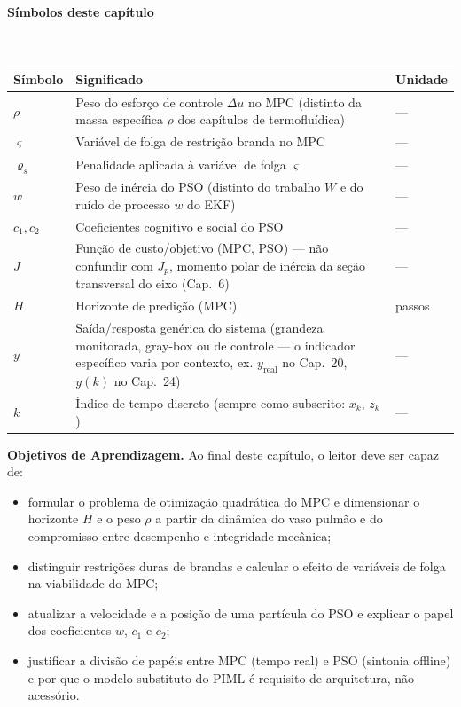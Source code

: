 \documentclass[12pt,a4paper]{article}
\numberwithin{equation}{section}
\numberwithin{table}{section}
\numberwithin{figure}{section}
\begin{document}
{\paragraph{Símbolos deste capítulo}\mbox{}\\[-0.5em]
{\small
\begin{longtable}{>{\raggedright\arraybackslash}p{2.6cm} >{\raggedright\arraybackslash}p{9.2cm} >{\raggedright\arraybackslash}p{2.6cm}}
	\toprule
	\textbf{Símbolo} & \textbf{Significado} & \textbf{Unidade} \\ \midrule
	\endhead
	$\rho$\dag & Peso do esforço de controle $\Delta u$ no MPC (distinto da massa específica $\rho$ dos capítulos de termofluídica) & --- \\
	$\varsigma$ & Variável de folga de restrição branda no MPC & --- \\
	$\varrho_s$ & Penalidade aplicada à variável de folga $\varsigma$ & --- \\
	$w$\dag & Peso de inércia do PSO (distinto do trabalho $W$ e do ruído de processo $w$ do EKF) & --- \\
	$c_1, c_2$ & Coeficientes cognitivo e social do PSO & --- \\
	$J$ & Função de custo/objetivo (MPC, PSO) — não confundir com $J_p$, momento polar de inércia da seção transversal do eixo (Cap.~6) & --- \\
	$H$ & Horizonte de predição (MPC) & passos \\
	$y$ & Saída/resposta genérica do sistema (grandeza monitorada, gray-box ou de controle — o indicador específico varia por contexto, ex. $y_{\text{real}}$ no Cap.~20, $y(k)$ no Cap.~24) & --- \\
	$k$ & Índice de tempo discreto (sempre como subscrito: $x_k$, $z_k$) & --- \\
	\bottomrule
\end{longtable}
}

	\textbf{Objetivos de Aprendizagem.} Ao final deste capítulo, o leitor
	deve ser capaz de:
	\begin{itemize}
		\item formular o problema de otimização quadrática do MPC e
		dimensionar o horizonte $H$ e o peso $\rho$ a partir da dinâmica
		do vaso pulmão e do compromisso entre desempenho e integridade
		mecânica;
		\item distinguir restrições duras de brandas e calcular o efeito
		de variáveis de folga na viabilidade do MPC;
		\item atualizar a velocidade e a posição de uma partícula do PSO
		e explicar o papel dos coeficientes $w$, $c_1$ e $c_2$;
		\item justificar a divisão de papéis entre MPC (tempo real) e PSO
		(sintonia offline) e por que o modelo substituto do PIML é
		requisito de arquitetura, não acessório.
	\end{itemize}

}
\end{document}
